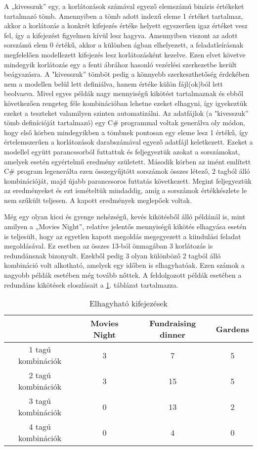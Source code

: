 \documentclass[12pt,a4paper]{report}
\begin{document}
    A „kivesszuk” egy, a korlátozások számával egyező elemszámú bináris értékeket tartalmazó tömb.
    Amennyiben a tömb adott indexű eleme 1 értéket tartalmaz, akkor a korlátozás a konkrét kifejezés értéke helyett egyszerűen igaz értéket vesz fel, így a kifejezést figyelmen kívül lesz hagyva.
    Amennyiben viszont az adott sorszámú elem 0 értékű, akkor a különben ágban elhelyezett, a feladatleírásnak megfelelően modellezett kifejezés lesz korlátozásként kezelve.
    Ezen elvet követve mindegyik korlátozás egy a fenti ábrához hasonló vezérlési szerkezetbe került beágyazásra.
    A "kivesszuk” tömböt pedig a könnyebb szerkeszthetőség érdekében nem a modellen belül lett definiálva, hanem értéke külön fájl(ok)ból lett beolvasva.
    Mivel egyes példák nagy mennyiségű kikötést tartalmaznak és ebből következően rengeteg féle kombinációban lehetne ezeket elhagyni, így igyekeztük ezeket a teszteket valamilyen szinten automatizálni.
    Az adatfájlok (a "kivesszuk” tömb definícióját tartalmazó) egy C\# programmal voltak generálva oly módon, hogy első körben mindegyikben a tömbnek pontosan egy eleme lesz 1 értékű, így értelemszerűen a korlátozások darabszámával egyező adatfájl keletkezett.
    Ezeket a modellel együtt parancssorból futtattuk és feljegyeztük azokat a sorszámokat, amelyek esetén egyértelmű eredmény született.
    Második körben az imént említett C\# program legenerálta ezen összegyűjtött sorszámok összes létező, 2 tagból álló kombinációját, majd újabb parancssoros futtatás következett.
    Megint feljegyeztük az eredményeket és ezt ismételtük mindaddig, amíg a sorszámok értékkészlete le nem szűkült teljesen.
    A kapott eredmények meglepőek voltak.
    
    Még egy olyan kicsi és gyenge nehézségű, kevés kikötésből álló példánál is, mint amilyen a „Movies Night”, relatíve jelentős mennyiségű kikötés elhagyása esetén is teljesült, hogy az egyetlen kapott megoldás megegyezett a kiindulási feladat megoldásával.
    Ez esetben az összes 13-ból önmagában 3 korlátozás is redundánsnak bizonyult.
    Ezekből pedig 3 olyan különböző 2 tagból álló kombináció volt alkotható, amelyek egy időben is elhagyhatóak.
    Ezen számok a nagyobb példák esetében még tovább nőttek.
    A feldolgozott példák esetében a redundáns kikötések eloszlásait a \ref{elhagyhato}. táblázat tartalmazza.

    
    \begin{table}[h]
    	\centering
    	\caption{Elhagyható kifejezések}
    	\label{elhagyhato}   
    	\begin{tabular}{|c|c|c|c|}
    		\hline 
    		& Movies Night & Fundraising dinner & Gardens \\ 
    		\hline 
    		1 tagú kombinációk & 3 & 7 & 5 \\ 
    		\hline 
    		2 tagú kombinációk & 3 & 15 & 5 \\ 
    		\hline 
    		3 tagú kombinációk & 0 & 13 & 2 \\ 
    		\hline 
    		4 tagú kombinációk & 0 & 4 & 0 \\ 
    		\hline 
    	\end{tabular} 
    \end{table}
    
\end{document}
